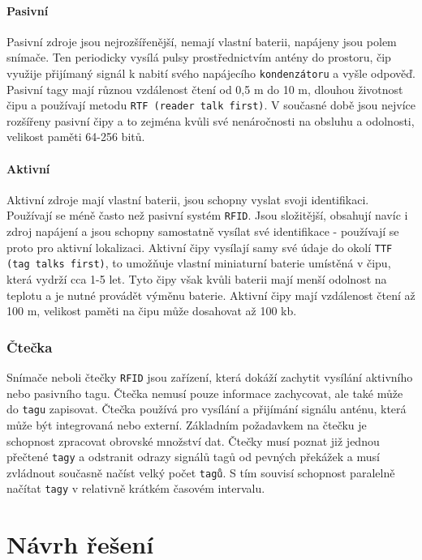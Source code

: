 \documentclass[czech,BP]{thesiskiv}
\begin{document}
\subsubsection{Pasivní}
Pasivní zdroje jsou nejrozšířenější, nemají vlastní baterii, napájeny jsou polem snímače. Ten periodicky vysílá pulsy prostřednictvím antény do prostoru, čip využije přijímaný signál k nabití svého napájecího \texttt{kondenzátoru} a vyšle odpověď. Pasivní tagy mají různou vzdálenost čtení od 0,5 m do 10 m, dlouhou životnost čipu a používají metodu \texttt{RTF (reader talk first)}. V současné době jsou nejvíce rozšířeny pasivní čipy a to zejména kvůli své nenáročnosti na obsluhu a odolnosti, velikost paměti 64-256 bitů.\cite{dolevcek2010identifikace}
\subsubsection{Aktivní}
Aktivní zdroje mají vlastní baterii, jsou schopny vyslat svoji identifikaci. Používají se méně často než pasivní systém \texttt{RFID}. Jsou složitější, obsahují navíc i zdroj napájení a jsou schopny samostatně vysílat své identifikace - používají se proto pro aktivní lokalizaci.
Aktivní čipy vysílají samy své údaje do okolí \texttt{TTF (tag talks first)}, to umožňuje vlastní miniaturní baterie umístěná v čipu, která vydrží cca 1-5 let. Tyto čipy však kvůli baterii mají menší odolnost na teplotu a je nutné provádět výměnu baterie. Aktivní čipy mají vzdálenost čtení až 100 m, velikost paměti na čipu může dosahovat až 100 kb.\cite{dolevcek2010identifikace}


\subsection{Čtečka}
Snímače neboli čtečky \texttt{RFID} jsou zařízení, která dokáží zachytit vysílání aktivního nebo pasivního tagu. Čtečka nemusí pouze informace zachycovat, ale také může do \texttt{tagu} zapisovat. Čtečka používá pro vysílání a přijímání signálu anténu, která může být integrovaná nebo externí. Základním požadavkem na čtečku je schopnost zpracovat obrovské množství dat. Čtečky musí poznat již jednou přečtené \texttt{tagy} a odstranit odrazy signálů tagů od pevných překážek a musí zvládnout současně načíst velký počet \texttt{tagů}. S tím souvisí schopnost paralelně načítat \texttt{tagy} v relativně krátkém časovém intervalu.\cite{dolevcek2010identifikace}	
	
	
	
	
\chapter{Návrh řešení}
\end{document}
